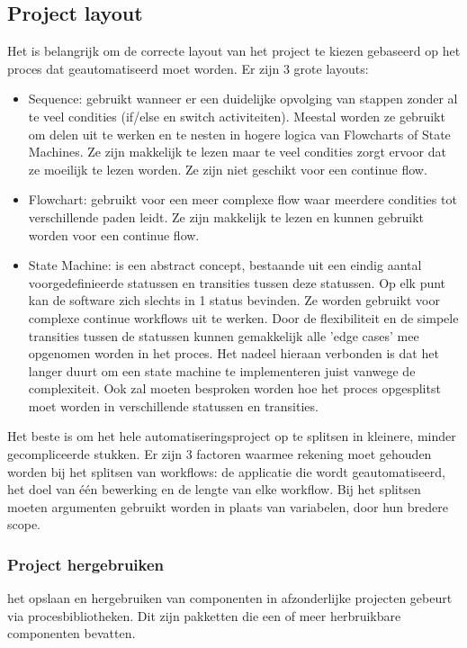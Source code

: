 \subsection{Project layout}
Het is belangrijk om de correcte layout van het project te kiezen gebaseerd op het proces dat geautomatiseerd moet worden. Er zijn 3 grote layouts:
\begin{itemize}
	\item Sequence: gebruikt wanneer er een duidelijke opvolging van stappen zonder al te veel condities (if/else en switch activiteiten). Meestal worden ze gebruikt om delen uit te werken en te nesten in hogere logica van Flowcharts of State Machines. Ze zijn makkelijk te lezen maar te veel condities zorgt ervoor dat ze moeilijk te lezen worden. Ze zijn niet geschikt voor een continue flow.
	\item Flowchart: gebruikt voor een meer complexe flow waar meerdere condities tot verschillende paden leidt. Ze zijn makkelijk te lezen en kunnen gebruikt worden voor een continue flow.
	\item State Machine: is een abstract concept, bestaande uit een eindig aantal voorgedefinieerde statussen en transities tussen deze statussen. Op elk punt kan de software zich slechts in 1 status bevinden. Ze worden gebruikt voor complexe continue workflows uit te werken. Door de flexibiliteit en de simpele transities tussen de statussen kunnen gemakkelijk alle 'edge cases' mee opgenomen worden in het proces. Het nadeel hieraan verbonden is dat het langer duurt om een state machine te implementeren juist vanwege de complexiteit. Ook zal moeten besproken worden hoe het proces opgesplitst moet worden in verschillende statussen en transities.
\end{itemize}

Het beste is om het hele automatiseringsproject op te splitsen in kleinere, minder gecompliceerde stukken. Er zijn 3 factoren waarmee rekening moet gehouden worden bij het splitsen van workflows: de applicatie die wordt geautomatiseerd, het doel van één bewerking en de lengte van elke workflow. Bij het splitsen moeten argumenten gebruikt worden in plaats van variabelen, door hun bredere scope.

\subsubsection{Project hergebruiken}
het opslaan en hergebruiken van componenten in afzonderlijke projecten gebeurt via procesbibliotheken. Dit zijn pakketten die een of meer herbruikbare componenten bevatten.

